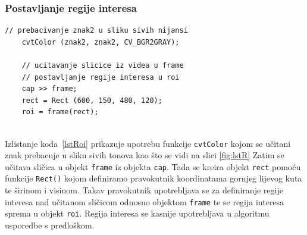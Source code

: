 \newpage
\subsubsection{Postavljanje regije interesa} %
\label{ssub:Postavljanje regije interesa}


\begin{lstlisting}[label=lstRoi,caption={Izvorni kod za postvljanje
regije interesa}]
    // prebacivanje znak2 u sliku sivih nijansi
    cvtColor (znak2, znak2, CV_BGR2GRAY);
    
    // ucitavanje slicice iz videa u frame
    // postavljanje regije interesa u roi
    cap >> frame;
    rect = Rect (600, 150, 480, 120);
    roi = frame(rect);
    
\end{lstlisting}

Izlistanje koda~\ref{lstRoi} prikazuje upotrebu funkcije
\texttt{cvtColor} kojom se učitani znak prebacuje u sliku sivih tonova
kao što se vidi na slici \ref{fig:lstR}
Zatim se učitava sličica u objekt \texttt{frame} iz objekta
\texttt{cap}. Tada se kreira objekt \texttt{rect} pomoću funkcije
\texttt{Rect()} kojom definiramo pravokutnik koordinatama gornjeg
lijevog kuta te širinom i visinom. Takav pravokutnik upotrebljava se za
definiranje regije interesa nad učitanom sličicom odnosno objektom
\texttt{frame} te se regija interesa sprema u objekt \texttt{roi}.
Regija interesa se kasnije upotrebljava u algoritmu usporedbe s
predloškom.

